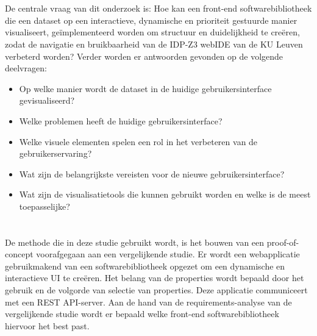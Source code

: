 \section{}%
\label{sec:onderzoeksvraag}
De centrale vraag van dit onderzoek is: Hoe kan een front-end softwarebibliotheek die een dataset op een interactieve, dynamische en prioriteit gestuurde manier visualiseert, geïmplementeerd worden om structuur en duidelijkheid te creëren, zodat de navigatie en bruikbaarheid van de IDP-Z3 webIDE van de KU Leuven verbeterd worden? Verder worden er antwoorden gevonden op de volgende deelvragen:
\begin{itemize}
    \item Op welke manier wordt de dataset in de huidige gebruikersinterface gevisualiseerd?
    \item Welke problemen heeft de huidige gebruikersinterface?
    \item Welke visuele elementen spelen een rol in het verbeteren van de gebruikerservaring?
    \item Wat zijn de belangrijkste vereisten voor de nieuwe gebruikersinterface?
    \item Wat zijn de visualisatietools die kunnen gebruikt worden en welke is de meest toepasselijke?
\end{itemize}


\section{}%
\label{sec:onderzoeksdoelstelling}
De methode die in deze studie gebruikt wordt, is het bouwen van een proof-of-concept voorafgegaan aan een vergelijkende studie. Er wordt een webapplicatie gebruikmakend van een softwarebibliotheek opgezet om een dynamische en interactieve UI te creëren. Het belang van de properties wordt bepaald door het gebruik en de volgorde van selectie van properties. Deze applicatie communiceert met een REST API-server. Aan de hand van de requirements-analyse van de vergelijkende studie wordt er bepaald welke front-end softwarebibliotheek hiervoor het best past.

